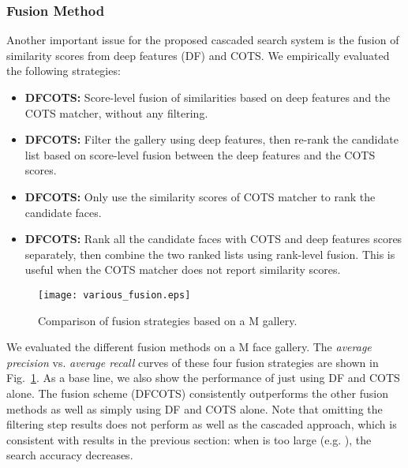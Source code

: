 \documentclass[10pt,journal,compsoc]{IEEEtran}
\begin{document}
\subsubsection{Fusion Method}
Another important issue for the proposed cascaded search system is the fusion of similarity scores from deep features (DF) and COTS. We empirically evaluated the following strategies:
\begin{itemize}
  \item {\bf DFCOTS:} Score-level fusion of similarities based on deep features and the COTS matcher, without any filtering.
  \item	{\bf DFCOTS:} Filter the gallery using deep features, then re-rank the candidate list based on score-level fusion between the deep features and the COTS scores.
  \item {\bf DFCOTS:} Only use the similarity scores of COTS matcher to rank the  candidate faces.
  \item {\bf DFCOTS:} Rank all the  candidate faces with COTS and deep features scores separately, then combine the two ranked lists using rank-level fusion. This is useful when the COTS matcher does not report similarity scores.
\end{itemize}
\begin{figure}
\centering
  \texttt{[image: various\_fusion.eps]}\\
  \caption{Comparison of fusion strategies based on a M gallery. }\label{fig:fusion}
\end{figure}
We evaluated the different fusion methods on a M face gallery. The \emph{average precision} vs. \emph{average recall} curves of these four fusion strategies are shown in Fig.~\ref{fig:fusion}. As a base line, we also show the performance of just using DF and COTS alone. The fusion scheme (DFCOTS) consistently outperforms the other fusion methods as well as simply using DF and COTS alone. Note that omitting the filtering step results does not perform as well as the cascaded approach, which is consistent with results in the previous section: when  is too large (e.g. ), the search accuracy decreases.
\end{document}
